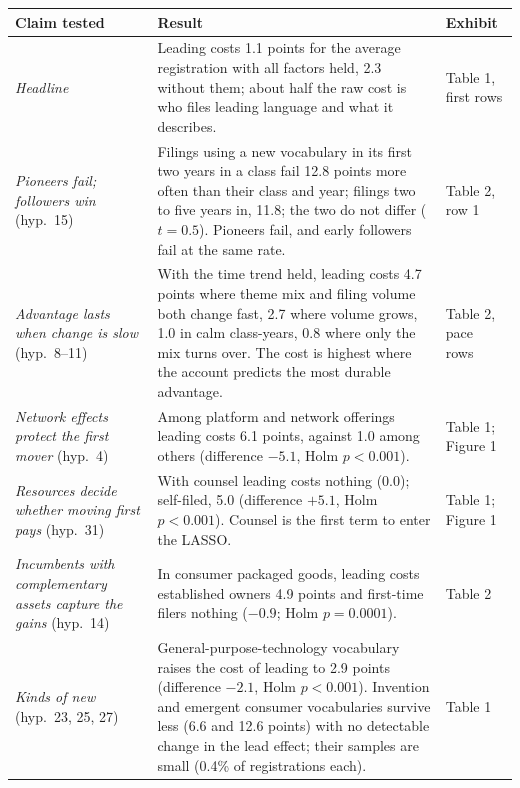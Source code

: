 \begin{longtable}{>{\raggedright\arraybackslash}p{3.0cm}>{\raggedright\arraybackslash}p{8.6cm}>{\raggedright\arraybackslash}p{2.5cm}}
\toprule
Claim tested & Result & Exhibit \\
\midrule
\endhead
\emph{Headline} & Leading costs 1.1 points for the average registration with all factors held, 2.3 without them; about half the raw cost is who files leading language and what it describes. & Table 1, first rows \\
\addlinespace
\emph{Pioneers fail; followers win} \citep{GolderTellis1993} (hyp.\ 15) & Filings using a new vocabulary in its first two years in a class fail 12.8 points more often than their class and year; filings two to five years in, 11.8; the two do not differ ($t = 0.5$). Pioneers fail, and early followers fail at the same rate. & Table 2, row 1 \\
\addlinespace
\emph{Advantage lasts when change is slow} \citep{SuarezLanzolla2007} (hyp.\ 8--11) & With the time trend held, leading costs 4.7 points where theme mix and filing volume both change fast, 2.7 where volume grows, 1.0 in calm class-years, 0.8 where only the mix turns over. The cost is highest where the account predicts the most durable advantage. & Table 2, pace rows \\
\addlinespace
\emph{Network effects protect the first mover} \citep{LiebermanMontgomery1988} (hyp.\ 4) & Among platform and network offerings leading costs 6.1 points, against 1.0 among others (difference $-5.1$, Holm $p < 0.001$). & Table 1; Figure 1 \\
\addlinespace
\emph{Resources decide whether moving first pays} \citep{LiebermanMontgomery1998} (hyp.\ 31) & With counsel leading costs nothing (0.0); self-filed, 5.0 (difference $+5.1$, Holm $p < 0.001$). Counsel is the first term to enter the LASSO. & Table 1; Figure 1 \\
\addlinespace
\emph{Incumbents with complementary assets capture the gains} \citep{Teece1986} (hyp.\ 14) & In consumer packaged goods, leading costs established owners 4.9 points and first-time filers nothing ($-0.9$; Holm $p = 0.0001$). & Table 2 \\
\addlinespace
\emph{Kinds of new} (hyp.\ 23, 25, 27) & General-purpose-technology vocabulary raises the cost of leading to 2.9 points (difference $-2.1$, Holm $p < 0.001$). Invention and emergent consumer vocabularies survive less (6.6 and 12.6 points) with no detectable change in the lead effect; their samples are small (0.4\% of registrations each). & Table 1 \\

\end{longtable}
